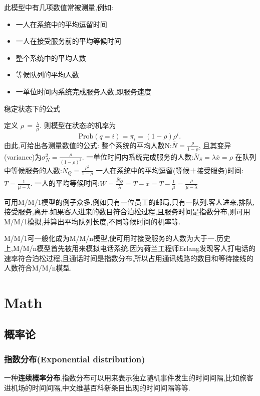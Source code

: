 \documentclass[openany]{book}
\begin{document}
此模型中有几项数值常被测量,例如:
\begin{itemize}
\item 一人在系统中的平均逗留时间
\item 一人在接受服务前的平均等候时间
\item 整个系统中的平均人数
\item 等候队列的平均人数
\item 一单位时间内系统完成服务人数,即服务速度
\end{itemize}

稳定状态下的公式

定义 $\scriptstyle \rho \,=\,{\tfrac  {\lambda }{\mu }}$.
则模型在状态i的机率为
$$
{\mbox{Prob}}(q=i)=\pi _{i}=(1-\rho )\rho ^{i}.\,
$$
由此,可给出各测量数值的公式:
整个系统的平均人数N:$\overline N={\frac  {\rho }{1-\rho }}$,
且其变异(variance)为$\sigma _{N}^{2}={\frac  {\rho }{(1-\rho )^{2}}}$.
一单位时间内系统完成服务的人数:$\overline N_{S}=\lambda \overline x=\rho$
在队列中等候服务的人数:$\overline N_{Q}={\frac  {\rho ^{2}}{1-\rho }}$
一人在系统中的平均逗留(等候＋接受服务)时间:$T={\frac  {1}{\mu -\lambda }}$.
一人的平均等候时间:$W={\frac  {\overline N_{Q}}{\lambda }}=T-\overline x=T-{\frac  {1}{\mu }}={\frac  {\rho }{\mu -\lambda }}$

\begin{example}
可用M/M/1模型的例子众多,例如只有一位员工的邮局,只有一队列.客人进来,排队,接受服务,离开.如果客人进来的数目符合泊松过程,且服务时间是指数分布,则可用M/M/1模拟,并算出平均队列长度,不同等候时间的机率等.

M/M/1可一般化成为M/M/n模型,使可用时接受服务的人数为大于一.历史上,M/M/n模型首先被用来模拟电话系统,因为荷兰工程师Erlang发现客人打电话的速率符合泊松过程,且通话时间是指数分布,所以占用通讯线路的数目和等待接线的人数符合M/M/n模型.
\end{example}

\part{Math}
\chapter{概率论}
\label{sec:probability}

\section{指数分布(Exponential distribution)}
\label{sec.distribution.exponential}
一种\textbf{连续概率分布}.指数分布可以用来表示独立随机事件发生的时间间隔,比如旅客进机场的时间间隔,中文维基百科新条目出现的时间间隔等等.
\end{document}
